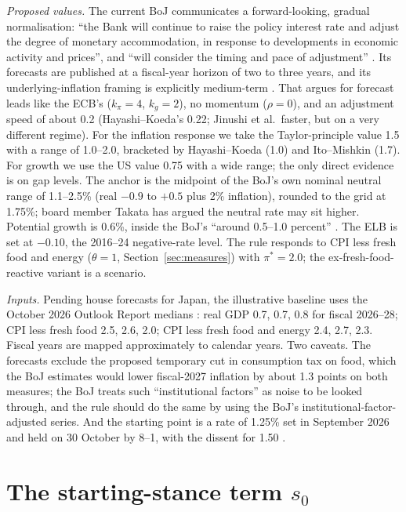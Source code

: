 \documentclass[11pt,a4paper]{article}
\newcommand{\pis}{\pi^{*}}
\begin{document}
\emph{Proposed values.} The current BoJ communicates a forward-looking, gradual normalisation: ``the Bank will continue to raise the policy interest rate and adjust the degree of monetary accommodation, in response to developments in economic activity and prices'', and ``will consider the timing and pace of adjustment'' \parencite{bojoutlook2026}. Its forecasts are published at a fiscal-year horizon of two to three years, and its underlying-inflation framing is explicitly medium-term \parencite{bojreview2026}. That argues for forecast leads like the ECB's ($k_\pi=4$, $k_g=2$), no momentum ($\rho=0$), and an adjustment speed of about 0.2 (Hayashi--Koeda's 0.22; Jinushi et al.\ faster, but on a very different regime). For the inflation response we take the Taylor-principle value 1.5 with a range of 1.0--2.0, bracketed by Hayashi--Koeda (1.0) and Ito--Mishkin (1.7). For growth we use the US value 0.75 with a wide range; the only direct evidence is on gap levels. The anchor is the midpoint of the BoJ's own nominal neutral range of 1.1--2.5\% (real $-0.9$ to $+0.5$ plus 2\% inflation), rounded to the grid at 1.75\%; board member Takata has argued the neutral rate may sit higher. Potential growth is 0.6\%, inside the BoJ's ``around 0.5--1.0 percent'' \parencite{bojoutlook2026}. The ELB is set at $-0.10$, the 2016--24 negative-rate level. The rule responds to CPI less fresh food and energy ($\theta=1$, Section~\ref{sec:measures}) with $\pis=2.0$; the ex-fresh-food-reactive variant is a scenario.

\emph{Inputs.} Pending house forecasts for Japan, the illustrative baseline uses the October 2026 Outlook Report medians \parencite{bojoutlook2026}: real GDP 0.7, 0.7, 0.8 for fiscal 2026--28; CPI less fresh food 2.5, 2.6, 2.0; CPI less fresh food and energy 2.4, 2.7, 2.3. Fiscal years are mapped approximately to calendar years. Two caveats. The forecasts exclude the proposed temporary cut in consumption tax on food, which the BoJ estimates would lower fiscal-2027 inflation by about 1.3 points on both measures; the BoJ treats such ``institutional factors'' as noise to be looked through, and the rule should do the same by using the BoJ's institutional-factor-adjusted series. And the starting point is a rate of 1.25\% set in September 2026 and held on 30 October by 8--1, with the dissent for 1.50 \parencite{bojstatement2026}.

\section{The starting-stance term \texorpdfstring{$s_0$}{s0}}
\label{sec:stance}
\end{document}

